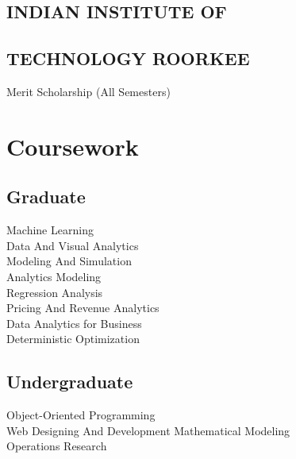 \documentclass[]{deedy-resume-openfont}
\begin{document}
\begin{minipage}[t]{0.31\textwidth}
\subsection{INDIAN INSTITUTE OF}
\subsection{TECHNOLOGY ROORKEE }
Merit Scholarship (All Semesters) \\
\sectionsep


\section{Coursework}
\subsection{Graduate}
Machine Learning \\
Data And Visual Analytics \\
Modeling And Simulation \\
Analytics Modeling \\ 
Regression Analysis \\
Pricing And Revenue Analytics \\
Data Analytics for Business \\
Deterministic Optimization \\
\vspace{0.75mm}

\sectionsep

\subsection{Undergraduate}
Object-Oriented Programming \\
Web Designing And Development
Mathematical Modeling \\
Operations Research
\sectionsep



\end{minipage}
\end{document}
